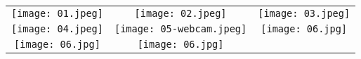 \documentclass[a3paper,10pt]{article}
\newlength{\hauteur}
\begin{document}
\begin{tabular}{ccc}
	\texttt{[image: 01.jpeg]} &
	\texttt{[image: 02.jpeg]} &
	\texttt{[image: 03.jpeg]}  \\
	\texttt{[image: 04.jpeg]} &
	\texttt{[image: 05-webcam.jpeg]} &
	\texttt{[image: 06.jpg]} \\
	\texttt{[image: 06.jpg]} &
	\texttt{[image: 06.jpg]} &
\end{tabular}
\end{document}
